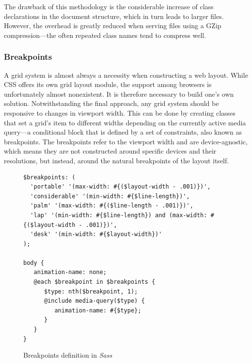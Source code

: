 \documentclass[thesis=M,english,hidelinks]{FITthesis}[2012/10/20]
\begin{document}
The drawback of this methodology is the considerable increase of class declarations in the document structure, which in turn leads to larger files. However, the overhead is greatly reduced when serving files using a GZip compression---the often repeated class names tend to compress well.

    \subsubsection{Breakpoints}

A grid system is almost always a necessity when constructing a web layout. While CSS offers its own grid layout module, the support among browsers is unfortunately almost nonexistent. It is therefore necessary to build one's own solution. Notwithstanding the final approach, any grid system should be responsive to changes in viewport width. This can be done by creating classes that set a grid's item to different widths depending on the currently active media query---a conditional block that is defined by a set of constraints, also known as breakpoints. The breakpoints refer to the viewport width and are device-agnostic, which means they are not constructed around specific devices and their resolutions, but instead, around the natural breakpoints of the layout itself.

\begin{figure}[h]
  \begin{lstlisting}
$breakpoints: (
  'portable' '(max-width: #{($layout-width - .001)})',
  'considerable' '(min-width: #{$line-length})',
  'palm' '(max-width: #{($line-length - .001)})',
  'lap' '(min-width: #{$line-length}) and (max-width: #{($layout-width - .001)})',
  'desk' '(min-width: #{$layout-width})'
);

body {
   animation-name: none;
   @each $breakpoint in $breakpoints {
      $type: nth($breakpoint, 1);
      @include media-query($type) {
         animation-name: #{$type};
      }
   }
}
  \end{lstlisting}
  \caption{Breakpoints definition in \textit{Sass}}
  \label{fig:sass_breakpoints}
\end{figure}
\end{document}

